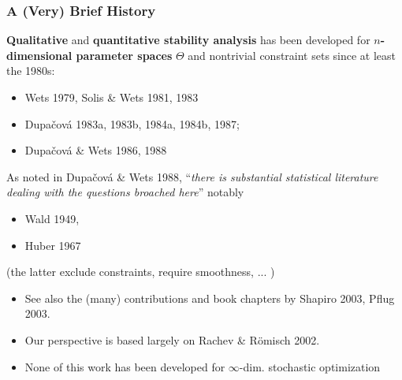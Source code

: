 \documentclass[aspectratio=169,xcolor=dvipsnames,10pt]{beamer}
\begin{document}
\begin{frame}\frametitle{A (Very) Brief History}
\begin{exampleblock}{}
{\smaller
\textbf{Qualitative} and \textbf{quantitative stability analysis} has been developed for \textbf{$n$-dimensional parameter spaces} $\Theta$ and nontrivial constraint sets since at least the 1980s:
\begin{itemize}
\item  Wets 1979, Solis \& Wets 1981, 1983
\item  Dupa\v{c}ov\'a 1983a, 1983b, 1984a, 1984b, 1987; 
\item Dupa\v{c}ov\'a \& Wets 1986, 1988
\end{itemize}
As noted in Dupa\v{c}ov\'a \& Wets 1988, ``\textit{there is substantial statistical literature dealing with the questions broached here}'' notably
\begin{itemize}
\item Wald 1949,
\item Huber 1967
\end{itemize}
(the latter exclude constraints, require smoothness, ... )\medskip

\begin{itemize}
\item See also the (many) contributions and book chapters by Shapiro 2003, Pflug 2003.
\item Our perspective  is based  largely on \alert{Rachev \& R\"omisch 2002}.
\item None of this work has been developed for $\infty$-dim. stochastic optimization
\end{itemize}
}
\end{exampleblock}
\end{frame}
\end{document}
